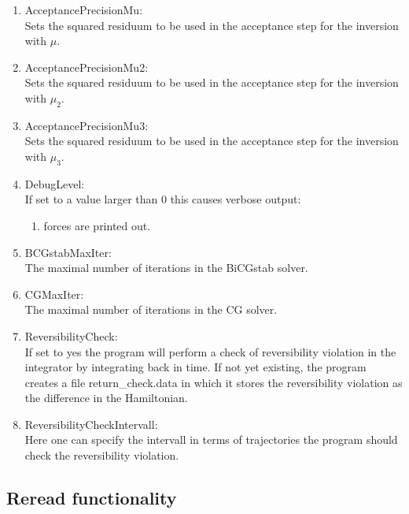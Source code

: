 \begin{enumerate}
\item {\ttfamily AcceptancePrecisionMu}:\\
  Sets the squared residuum to be used in the acceptance step for
  the inversion with $\mu$.

\item {\ttfamily AcceptancePrecisionMu2}:\\
  Sets the squared residuum to be used in the acceptance step for
  the inversion with $\mu_2$.

\item {\ttfamily AcceptancePrecisionMu3}:\\
  Sets the squared residuum to be used in the acceptance step for
  the inversion with $\mu_3$.

\item {\ttfamily DebugLevel}:\\
  If set to a value larger than $0$ this causes verbose output:
  \begin{enumerate}
  \item forces are printed out.
  \end{enumerate}

\item {\ttfamily BCGstabMaxIter}:\\
  The maximal number of iterations in the BiCGstab solver.

\item {\ttfamily CGMaxIter}:\\
  The maximal number of iterations in the CG solver.

\item {\ttfamily ReversibilityCheck}:\\
  If set to {\ttfamily yes} the program will perform a check of
  reversibility violation in the integrator by integrating back in
  time. If not yet existing, the program creates a file {\ttfamily
    return\_check.data} in which it stores the reversibility violation
  as the difference in the Hamiltonian.

\item {\ttfamily ReversibilityCheckIntervall}:\\
  Here one can specify the intervall in terms of trajectories the
  program should check the reversibility violation.

\end{enumerate}

\subsection{Reread functionality}

